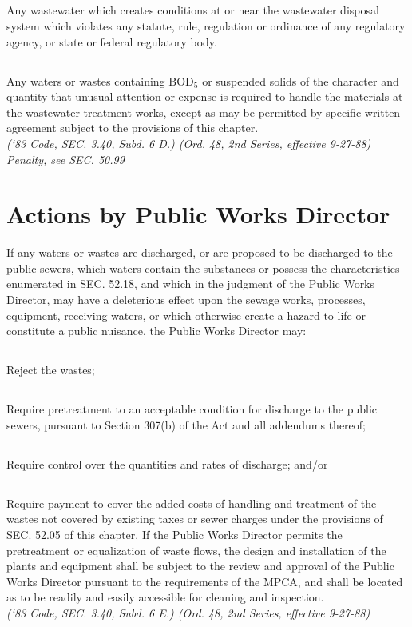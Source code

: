 \subsection{}
Any wastewater which creates conditions at or near the wastewater disposal system which violates any statute, rule, regulation or ordinance of any regulatory agency, or state or federal regulatory body.
\subsection{}
Any waters or wastes containing BOD$_{5}$ or suspended solids of the character and quantity that unusual attention or expense is required to handle the materials at the wastewater treatment works, except as may be permitted by specific written agreement subject to the provisions of this chapter.\\
\emph{(‘83 Code, SEC. 3.40, Subd. 6 D.) (Ord. 48, 2nd Series, effective 9-27-88)}\\
\emph{Penalty, see SEC. 50.99}
\section{Actions by Public Works Director}
If any waters or wastes are discharged, or are proposed to be discharged to the public sewers, which waters contain the substances or possess the characteristics enumerated in SEC. 52.18, and which in the judgment of the Public Works Director, may have a deleterious effect upon the sewage works, processes, equipment, receiving waters, or which otherwise create a hazard to life or constitute a public nuisance, the Public Works Director may:
\subsection{}
Reject the wastes;
\subsection{}
Require pretreatment to an acceptable condition for discharge to the public sewers, pursuant to Section 307(b) of the Act and all addendums thereof;
\subsection{}
Require control over the quantities and rates of discharge; and/or
\subsection{}
Require payment to cover the added costs of handling and treatment of the wastes not covered by existing taxes or sewer charges under the provisions of SEC. 52.05 of this chapter.  If the Public Works Director permits the pretreatment or equalization of waste flows, the design and installation of the plants and equipment shall be subject to the review and approval of the Public Works Director pursuant to the requirements of the MPCA, and shall be located as to be readily and easily accessible for cleaning and inspection.\\
\emph{(‘83 Code, SEC. 3.40, Subd. 6 E.) (Ord. 48, 2nd Series, effective 9-27-88)}
